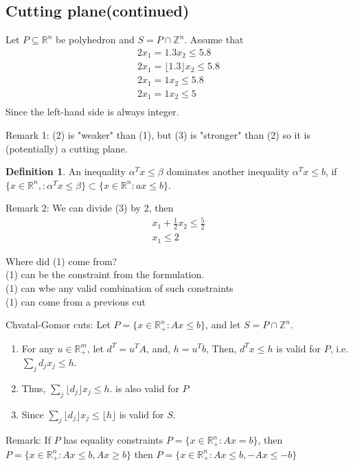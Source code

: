 \documentclass{article}
\theoremstyle{plain}
\theoremstyle{definition}
\newtheorem{defn}{Definition}
\newcommand{\floor}[1]{\lfloor #1 \rfloor}
\begin{document}
\subsection{Cutting plane(continued)}
Let $P\subseteq \mathbb{R}^n$ be polyhedron and $S = P\cap \mathbb{Z}^n$.
Assume that
\begin{align}
    2x_1  = 1.3x_2 \leq 5.8\\
    2x_1  = \floor{1.3}x_2 \leq 5.8\\
    2x_1  = 1x_2 \leq 5.8\\
    2x_1  = 1x_2 \leq 5\\
\end{align}
Since the left-hand side is always integer.

Remark 1: (2) is "weaker" than (1), but (3) is "stronger" than (2) so it
is (potentially) a cutting plane.

\begin{defn}
    An inequality $\alpha^Tx \leq \beta$ dominates another
    inequality $\alpha^Tx \leq b$, if $\{x\in\mathbb{R}^n,: \alpha^Tx \leq \beta\}
    \subset \{x\in\mathbb{R}^n: ax\leq b\}$.
\end{defn}

Remark 2: We can divide (3) by 2, then
\begin{align*}
    x_1 + \frac{1}{2}x_2 \leq \frac{5}{2}\\
    x_1 \leq 2
\end{align*}

Where did (1) come from?\\
(1) can be the constraint from the formulation.\\
(1) can wbe any valid combination of such constraints\\
(1) can come from a previous cut

Chvatal-Gomor cuts: Let $P = \{x\in\mathbb{R}^n_+: Ax\leq b\}$,
and let $S = P\cap \mathbb{Z}^n$.
\begin{enumerate}
    \item For any $u\in\mathbb{R}^m_+$, let $d^T = u^TA$, and,
        $h = u^Tb$, Then, $d^Tx\leq h$ is valid for $P$, i.e.
        $\sum_j d_jx_j \leq h$.
    \item
        Thus,
        $\sum_j \floor{d_j}x_j \leq h$. is also valid for $P$
    \item
        Since $\sum_j\floor{d_j}x_j \leq \floor{h}$ is valid for $S$.
\end{enumerate}

Remark: If $P$ has equality constraints $P = \{x\in\mathbb{R}^n_+: Ax =b\}$,
then $P = \{x\in \mathbb{R}^n_+: Ax\leq b, Ax\geq b\}$
then $P = \{x\in \mathbb{R}^n_+: Ax\leq b, -Ax\leq -b\}$
\end{document}
